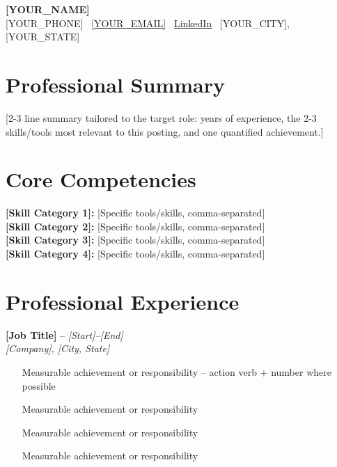 \documentclass[11pt,letterpaper]{article}
\newcommand{\cvheader}[3]{%
  \noindent\textbf{#1} -- \textit{#3}\\
  \textit{#2}
}
\begin{document}
\begin{center}
  {\LARGE\bfseries [YOUR_NAME]}\\[2pt]
  [YOUR_PHONE] \textbar\ \href{mailto:[YOUR_EMAIL]}{[YOUR_EMAIL]} \textbar\ \href{[YOUR_LINKEDIN_URL]}{LinkedIn} \textbar\ [YOUR_CITY], [YOUR_STATE]
\end{center}

\section{Professional Summary}
[2-3 line summary tailored to the target role: years of experience, the 2-3 skills/tools most relevant to this posting, and one quantified achievement.]

\section{Core Competencies}
\textbf{[Skill Category 1]:} [Specific tools/skills, comma-separated] \\
\textbf{[Skill Category 2]:} [Specific tools/skills, comma-separated] \\
\textbf{[Skill Category 3]:} [Specific tools/skills, comma-separated] \\
\textbf{[Skill Category 4]:} [Specific tools/skills, comma-separated]

\section{Professional Experience}

\cvheader{[Job Title]}{[Company], [City, State]}{[Start]--[End]}
\begin{itemize}
  \item [Measurable achievement or responsibility -- action verb + number where possible]
  \item [Measurable achievement or responsibility]
  \item [Measurable achievement or responsibility]
  \item [Measurable achievement or responsibility]
\end{itemize}
\end{document}
